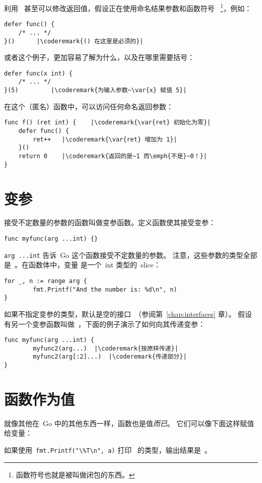 利用~ 甚至可以修改返回值，假设正在使用命名结果参数和函数符号
~\footnote{函数符号也就是被叫做闭包的东西。}，例如：
\begin{lstlisting}[caption=函数符号]
defer func() {
	/* ... */
}()		 |\coderemark{() 在这里是必须的}|
\end{lstlisting}
或者这个例子，更加容易了解为什么，以及在哪里需要括号：
\begin{lstlisting}[caption=带参数的函数符号]
defer func(x int) {
	/* ... */
}(5)		 |\coderemark{为输入参数~\var{x} 赋值 5}|
\end{lstlisting}
在这个（匿名）函数中，可以访问任何命名返回参数：
\begin{lstlisting}[caption=在 defer 中访问返回值]
func f() (ret int) {    |\coderemark{\var{ret} 初始化为零}|
	defer func() {
		ret++	|\coderemark{\var{ret} 增加为 1}|
	}()
	return 0	|\coderemark{返回的是~1 而\emph{不是}~0！}|
}
\end{lstlisting}

\section{变参}
接受不定数量的参数的函数叫做变参函数。定义函数使其接受变参：
\begin{lstlisting}
func myfunc(arg ...int) {}
\end{lstlisting}
\lstinline{arg ...int} 告诉~Go 这个函数接受不定数量的参数。
注意，这些参数的类型全部是~。在函数体中，变量
 是一个~int 类型的~slice：
\begin{lstlisting}
for _, n := range arg {
        fmt.Printf("And the number is: %d\n", n)
}
\end{lstlisting}
如果不指定变参的类型，默认是空的接口~（参阅第~\ref{chap:interfaces} 章）。
假设有另一个变参函数叫做~，下面的例子演示了如何向其传递变参：
\begin{lstlisting}
func myfunc(arg ...int) {
        myfunc2(arg...)  |\coderemark{按原样传递}|
        myfunc2(arg[:2]...)  |\coderemark{传递部分}|
}
\end{lstlisting}

\section{函数作为值}
\label{sec:functions as values}
就像其他在~Go 中的其他东西一样，函数也是值\emph{而已}。
它们可以像下面这样赋值给变量：

如果使用~\lstinline{fmt.Printf("\%T\n", a)} 打印~ 的类型，输出结果是~。

